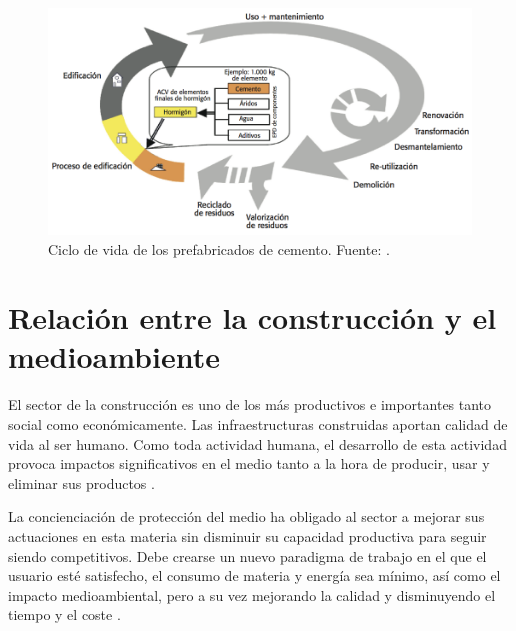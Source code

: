 \begin{figure}[!htb]
\centering
\includegraphics[width=12cm]{img/ciclodevida.png}
\caption[Ciclo de vida de los prefabricados de cemento.]{Ciclo de vida de los prefabricados de cemento. Fuente: \cite{oficemen}.}
\label{fig:ciclodevidaprefabric}
\end{figure}

\section{Relación entre la construcción y el medioambiente}
El sector de la construcción es uno de los más productivos e importantes tanto social como económicamente. Las infraestructuras construidas aportan calidad de vida al ser humano. Como toda actividad humana, el desarrollo de esta actividad provoca impactos significativos en el medio tanto a la hora de producir, usar y eliminar sus productos \cite{carvalho}.

La concienciación de protección del medio ha obligado al sector a mejorar sus actuaciones en esta materia sin disminuir su capacidad productiva para seguir siendo competitivos. Debe crearse un nuevo paradigma de trabajo en el que el usuario esté satisfecho, el consumo de materia y energía sea mínimo, así como el impacto medioambiental, pero a su vez mejorando la calidad y disminuyendo el tiempo y el coste \cite{augenbroe}.

